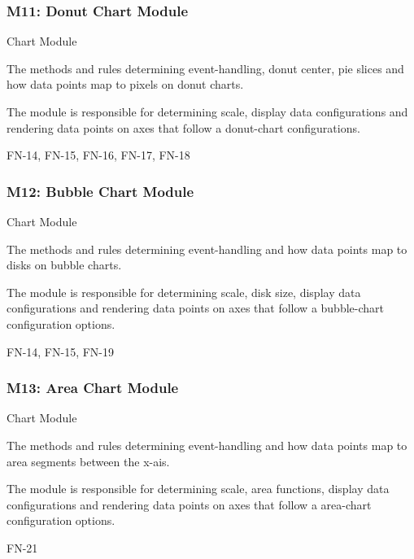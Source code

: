 \documentclass[12pt, titlepage]{article}
\begin{document}
\subsubsection{M11: Donut Chart Module}
\begin{description}[style=nextline]
\item[Type:] Chart Module
\item[Secrets:] The methods and rules determining event-handling, donut center, pie slices and how data points map to pixels on donut charts.
\item[Responsibilities:] The module is responsible for determining scale, display data configurations and rendering data points on axes that follow a donut-chart configurations.
\item[Requirements:] FN-14, FN-15, FN-16, FN-17, FN-18
\end{description}


\subsubsection{M12: Bubble Chart Module}
\begin{description}[style=nextline]
\item[Type:] Chart Module
\item[Secrets:] The methods and rules determining event-handling and how data points map to disks on bubble charts.
\item[Responsibilities:] The module is responsible for determining scale, disk size, display data configurations and rendering data points on axes that follow a bubble-chart configuration options. 
\item[Requirements:] FN-14, FN-15, FN-19
\end{description}

\subsubsection{M13: Area Chart Module}
\begin{description}[style=nextline]
\item[Type:] Chart Module
\item[Secrets:] The methods and rules determining event-handling and how data points map to area segments between the x-ais.
\item[Responsibilities:] The module is responsible for determining scale, area functions, display data configurations and rendering data points on axes that follow a area-chart configuration options.
\item[Requirements:] FN-21
\end{description}
\end{document}

